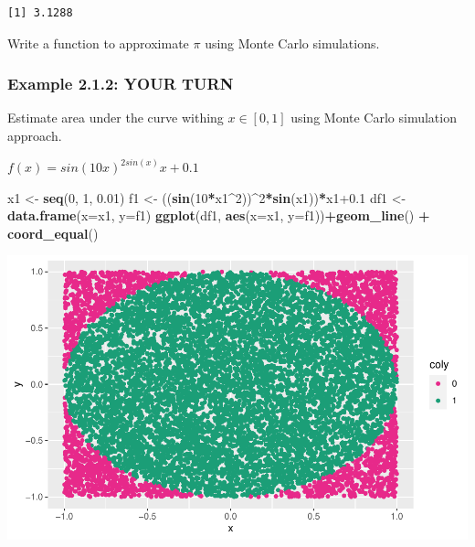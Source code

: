 \documentclass[]{article}
\newenvironment{Shaded}{\begin{snugshade}}{\end{snugshade}}
\newcommand{\DataTypeTok}[1]{\textcolor[rgb]{0.13,0.29,0.53}{#1}}
\newcommand{\DecValTok}[1]{\textcolor[rgb]{0.00,0.00,0.81}{#1}}
\newcommand{\FloatTok}[1]{\textcolor[rgb]{0.00,0.00,0.81}{#1}}
\newcommand{\KeywordTok}[1]{\textcolor[rgb]{0.13,0.29,0.53}{\textbf{#1}}}
\newcommand{\NormalTok}[1]{#1}
\newcommand{\OperatorTok}[1]{\textcolor[rgb]{0.81,0.36,0.00}{\textbf{#1}}}
\newcommand{\StringTok}[1]{\textcolor[rgb]{0.31,0.60,0.02}{#1}}
\begin{document}
\begin{verbatim}
[1] 3.1288
\end{verbatim}

Write a function to approximate \(\pi\) using Monte Carlo simulations.

\hypertarget{example-2.1.2-your-turn}{%
\subsubsection{Example 2.1.2: YOUR TURN}\label{example-2.1.2-your-turn}}

Estimate area under the curve withing \(x \in [0, 1]\) using Monte Carlo
simulation approach.

\(f(x) = sin(10x)^{2sin(x)}x+0.1\)

\begin{Shaded}
\begin{Highlighting}[]
\NormalTok{x1 <-}\StringTok{ }\KeywordTok{seq}\NormalTok{(}\DecValTok{0}\NormalTok{, }\DecValTok{1}\NormalTok{, }\FloatTok{0.01}\NormalTok{)}
\NormalTok{f1 <-}\StringTok{ }\NormalTok{((}\KeywordTok{sin}\NormalTok{(}\DecValTok{10}\OperatorTok{*}\NormalTok{x1}\OperatorTok{^}\DecValTok{2}\NormalTok{))}\OperatorTok{^}\DecValTok{2}\OperatorTok{*}\KeywordTok{sin}\NormalTok{(x1))}\OperatorTok{*}\NormalTok{x1}\FloatTok{+0.1}
\NormalTok{df1 <-}\StringTok{ }\KeywordTok{data.frame}\NormalTok{(}\DataTypeTok{x=}\NormalTok{x1, }\DataTypeTok{y=}\NormalTok{f1)}
\KeywordTok{ggplot}\NormalTok{(df1, }\KeywordTok{aes}\NormalTok{(}\DataTypeTok{x=}\NormalTok{x1, }\DataTypeTok{y=}\NormalTok{f1))}\OperatorTok{+}\KeywordTok{geom_line}\NormalTok{() }\OperatorTok{+}\StringTok{ }\KeywordTok{coord_equal}\NormalTok{()}
\end{Highlighting}
\end{Shaded}

\includegraphics{Monte_Carlo_files/figure-latex/unnamed-chunk-5-1.pdf}
\end{document}
